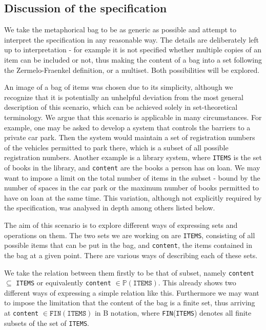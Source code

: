 \documentclass[11pt,journal]{IEEEtran}
\begin{document}
	\subsection{Discussion of the specification}
	We take the metaphorical bag to be as generic as possible and attempt to interpret the specification in any reasonable way. The details are deliberately left up to interpretation - for example it is not specified whether multiple copies of an item can be included or not, thus making the content of a bag into a set following the Zermelo-Fraenkel definition, or a multiset. Both possibilities will be explored.
	
	An image of a bag of items was chosen due to its simplicity, although we recognize that it is potentially an unhelpful deviation from the most general description of this scenario, which can be achieved solely in set-theoretical terminology. We argue that this scenario is applicable in many circumstances. For example, one may be asked to develop a system that controls the barriers to a private car park. Then the system would maintain a set of registration numbers of the vehicles permitted to park there, which is a subset of all possible registration numbers. Another example is a library system, where \texttt{ITEMS} is the set of books in the library, and \texttt{content} are the books a person has on loan. We may want to impose a limit on the total number of items in the subset - bound by the number of spaces in the car park or the maximum number of books permitted to have on loan at the same time. This variation, although not explicitly required by the specification, was analysed in depth among others listed below.
	
	The aim of this scenario is to explore different ways of expressing sets and operations on them. The two sets we are working on are \texttt{ITEMS}, consisting of all possible items that can be put in the bag, and \texttt{content}, the items contained in the bag at a given point. There are various ways of describing each of these sets. 
	
	We take the relation between them firstly to be that of subset, namely \texttt{content} $\subseteq$ \texttt{ITEMS} or equivalently \texttt{content} $\in \mathbb{P}(\texttt{ITEMS})$. This already shows two different ways of expressing a simple relation like this. Furthermore we may want to impose the limitation that the content of the bag is a finite set, thus arriving at \texttt{content} $\in \texttt{FIN}(\texttt{ITEMS})$ in B notation, where \texttt{FIN}(\texttt{ITEMS}) denotes all finite subsets of the set of \texttt{ITEMS}. 
	
\end{document}
